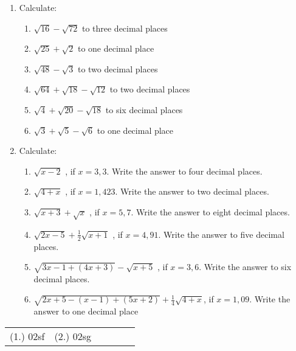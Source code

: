 \begin{eocexercises}{}
 \begin{enumerate}
  \item Calculate:
\begin{enumerate}
 \item $\sqrt{16}−\sqrt{72}$ to three decimal places
\item $\sqrt{25}+\sqrt{2}$ to one decimal place
\item $\sqrt{48}−\sqrt{3}$ to two decimal places
\item $\sqrt{64}+\sqrt{18}−\sqrt{12}$ to two decimal places
\item $\sqrt{4}+\sqrt{20}−\sqrt{18}$ to six decimal places
\item $\sqrt{3}+\sqrt{5}−\sqrt{6}$ to one decimal place
\end{enumerate}

\item Calculate:
\begin{enumerate}
 \item $\sqrt{x−2}$ , if $x=3,3$. Write the answer to four decimal places.
\item $\sqrt{4+x}$ , if $x=1,423$. Write the answer to two decimal places.
\item $\sqrt{x+3}+\sqrt{x}$ , if $x=5,7$. Write the answer to eight decimal places.
\item $\sqrt{2x−5}+\frac{1}{2}\sqrt{x+1}$ , if $x=4,91$. Write the answer to five decimal places.
\item $\sqrt{3x−1+(4x+3)}−\sqrt{x+5}$ , if $x=3,6$. Write the answer to six decimal places.
\item $\sqrt{2x+5−(x−1)+(5x+2)}+\frac{1}{4}\sqrt{4+x}$, if $x=1,09$. Write the answer to one decimal place
\end{enumerate}

 \end{enumerate}
\par \practiceinfo
\par \begin{tabular}[h]{cccccc}
(1.) 02sf	&
(2.) 02sg	&
\end{tabular}
\end{eocexercises}






